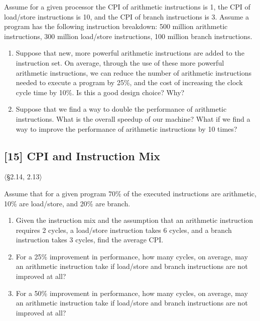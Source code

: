 \noindent Assume for a given processor the CPI of arithmetic instructions is
1, the CPI of load/store instructions is 10, and the CPI of branch
instructions is 3. Assume a program has the following instruction breakdown:
500 million arithmetic instructions, 300 million load/store instructions,
100 million branch instructions.

\begin{enumerate}
  \item[2.39.1] [5] Suppose that new, more powerful arithmetic instructions are
        added to the instruction set. On average, through the use of these
        more powerful arithmetic instructions, we can reduce the number of
        arithmetic instructions needed to execute a program by 25\%, and the
        cost of increasing the clock cycle time by 10\%. Is this a good
        design choice? Why?
  \item[2.39.2] [5] Suppose that we find a way to double the performance of
        arithmetic instructions. What is the overall speedup of our machine?
        What if we find a way to improve the performance of arithmetic
        instructions by 10 times?
\end{enumerate}

\problembreak

\subsection{[15] CPI and Instruction Mix}
\hypertarget{prob-2.40}{}
\noindent$\langle$\S2.14, 2.13$\rangle$\medskip

\noindent Assume that for a given program 70\% of the executed instructions
are arithmetic, 10\% are load/store, and 20\% are branch.

\begin{enumerate}
  \item[2.40.1] [5] Given the instruction mix and the assumption that an
        arithmetic instruction requires 2 cycles, a load/store instruction
        takes 6 cycles, and a branch instruction takes 3 cycles, find the
        average CPI.
  \item[2.40.2] [5] For a 25\% improvement in performance, how many cycles, on
        average, may an arithmetic instruction take if load/store and branch
        instructions are not improved at all?
  \item[2.40.3] [5] For a 50\% improvement in performance, how many cycles, on
        average, may an arithmetic instruction take if load/store and branch
        instructions are not improved at all?
\end{enumerate}


